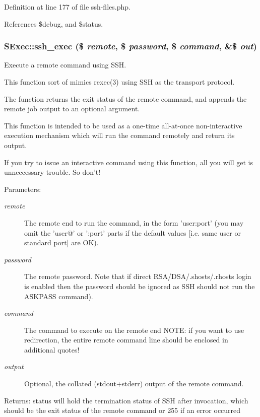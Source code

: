 Definition at line 177 of file ssh-files.php.

References \$debug, and \$status.
\subsubsection{\setlength{\rightskip}{0pt plus 5cm}SExec::ssh\_\-exec (\$ {\em remote}, \$ {\em password}, \$ {\em command}, \&\$ {\em out})}\label{classSExec_a14}


Execute a remote command using SSH. 

This function sort of mimics rexec(3) using SSH as the transport protocol.

The function returns the exit status of the remote command, and appends the remote job output to an optional argument.

This function is intended to be used as a one-time all-at-once non-interactive execution mechanism which will run the command remotely and return its output.

If you try to issue an interactive command using this function, all you will get is unneccessary trouble. So don't!

\begin{Desc}
\item[Parameters:]
\begin{description}
\item[{\em remote}]The remote end to run the command, in the form 'user:port' (you may omit the 'user@' or ':port' parts if the default values [i.e. same user or standard port] are OK). \item[{\em password}]The remote password. Note that if direct RSA/DSA/.shosts/.rhosts login is enabled then the password should be ignored as SSH should not run the ASKPASS command). \item[{\em command}]The command to execute on the remote end NOTE: if you want to use redirection, the entire remote command line should be enclosed in additional quotes! \item[{\em output}]Optional, the collated (stdout+stderr) output of the remote command. \end{description}
\end{Desc}
\begin{Desc}
\item[Returns:]status will hold the termination status of SSH after invocation, which should be the exit status of the remote command or 255 if an error occurred \end{Desc}


